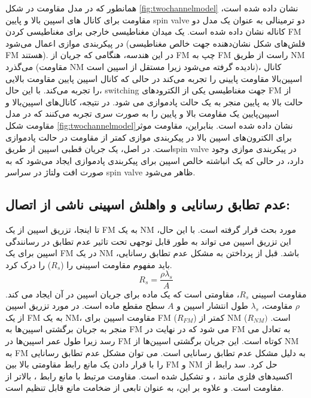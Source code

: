 همانطور که در مدل مقاومت در شکل \ref{fig:twochannelmodel} نشان داده شده است، مقاومت برای کانال های اسپین بالا و پایین \gls{spin valve} دو ترمینالی به عنوان یک مدل دو کاناله نشان داده شده است. یک میدان مغناطیسی خارجی برای مغناطیسی کردن \gls{FM} در پیکربندی موازی اعمال می‌شود (فلش‌های شکل نشان‌دهنده جهت خالص مغناطیسی \gls{FM} هستند). در این هندسه، هنگامی که جریان از \gls{FM} چپ به \gls{FM} راست از طریق \gls{NM} می‌گذرد (مقاومت \gls{NM} نادیده گرفته می‌شود زیرا مستقل از اسپین است)، کانال اسپین‌بالا مقاومت پایینی را تجربه می‌کند در حالی که کانال اسپین پایین مقاومت بالایی را تجربه می‌کند. با این حال، \gls{switching} جهت مغناطیسی یکی از الکترودهای \gls{FM} از حالت بالا به پایین منجر به یک حالت پاد‌موازی می شود. در نتیجه، کانال‌های اسپین‌بالا و اسپین‌پایین یک مقاومت بالا و پایین را به صورت سری تجربه می‌کنند که در مدل مقاومت شکل \ref{fig:twochannelmodel}نشان داده شده است. بنابراین، مقاومت موثر برای الکترون‌های اسپین بالا در پیکربندی موازی کمتر از مقاومت در حالت پاد‌موازی است. در اصل، یک جریان قطبی اسپین از طریق\gls{spin valve} در پیکربندی موازی وجود دارد، در حالی که یک انباشته خالص اسپین برای پیکربندی پاد‌موازی ایجاد می‌شود که به صورت افت ولتاژ در سراسر \gls{spin valve} ظاهر می‌شود.

\subsection{عدم تطابق رسانایی و واهلش اسپینی ناشی از اتصال:}
تا اینجا، تزریق اسپین از یک \gls{FM} به یک \gls{NM} مورد بحث قرار گرفته است. با این حال، این تزریق اسپین می تواند به طور قابل توجهی تحت تاثیر عدم تطابق در رسانندگی اسپین برای یک \gls{FM} در یک \gls{NM} باشد. قبل از پرداختن به مشکل عدم تطابق رسانایی، باید مفهوم مقاومت اسپینی را ($R_s$) را درک کرد.
\begin{equation}
    R_{s}=\frac{\rho\lambda_{s}}{A}
\end{equation}
مقاومت اسپینی $R_s$، مقاومتی است که یک ماده برای جریان اسپین در آن ایجاد می کند. $\rho$ مقاومت، $\lambda_s$ طول انتشار اسپین و $A$ سطح مقطع ماده است. در مورد تزریق اسپین از یک \gls{FM} به یک \gls{NM}، مقاومت اسپین برای \gls{FM} ($R_{FM}$) کمتر از \gls{NM} ($R_{NM})$ است. منجر به جریان برگشتی اسپین‌ها به \gls{FM} می شود که در نهایت در \gls{FM} به تعادل می رسد زیرا طول عمر اسپین‌ها در \gls{FM} کوتاه است. این جریان برگشتی اسپین‌ها از \gls{NM} به \gls{FM} به دلیل مشکل عدم تطابق رسانایی است.
می توان مشکل عدم تطابق رسانایی را با قرار دادن یک مانع رابط مقاومتی بالا بین \gls{FM} و \gls{NM} حل کرد. سد رابط از اکسیدهای فلزی مانند ،  و  تشکیل شده است. مقاومت مرتبط با مانع رابط ، بالاتر از مقاومت  است. و علاوه بر این،  به عنوان تابعی از ضخامت مانع قابل تنظیم است.

